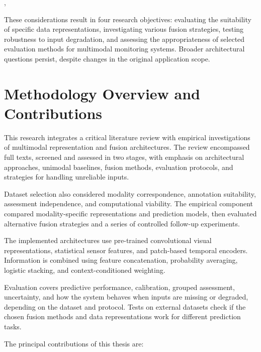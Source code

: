 {, }

These considerations result in four research objectives: evaluating
the suitability of specific data representations, investigating
various fusion strategies, testing robustness to input degradation,
and assessing the appropriateness of selected evaluation methods
for multimodal monitoring systems. Broader architectural questions
persist, despite changes in the original application scope.



\section{Methodology Overview and Contributions}

This research integrates a critical literature review with empirical
investigations of multimodal representation and fusion architectures.
The review encompassed \ReviewWorkCount{} full texts, screened and
assessed in two stages, with emphasis on architectural approaches,
unimodal baselines, fusion methods, evaluation protocols, and
strategies for handling unreliable inputs.

Dataset selection also considered modality correspondence,
annotation suitability, assessment independence, and computational
viability. The empirical component compared modality-specific
representations and prediction models, then evaluated alternative
fusion strategies and a series of controlled follow-up experiments.

The implemented architectures use pre-trained convolutional visual
representations, statistical sensor features, and patch-based
temporal encoders. Information is combined using feature
concatenation, probability averaging, logistic stacking, and
context-conditioned weighting.

Evaluation covers predictive performance, calibration, grouped
assessment, uncertainty, and how the system behaves when inputs
are missing or degraded, depending on the dataset and protocol.
Tests on external datasets check if the chosen fusion methods
and data representations work for different prediction tasks.

The principal contributions of this thesis are:

